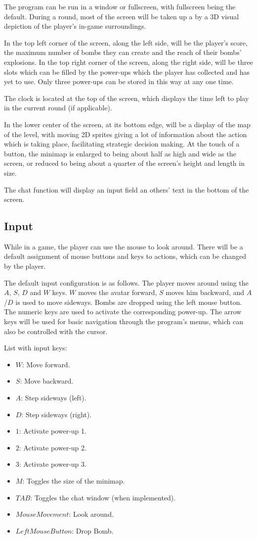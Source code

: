 \documentclass[a4paper,twoside,11pt]{article}
\begin{document}
The program can be run in a window or fullscreen, with fullscreen being the default. During a round, most of the screen will be taken up a by a 3D visual depiction of the player's in-game surroundings.

In the top left corner of the screen, along the left side, will be the player's score, the maximum number of bombs they can create and the reach of their bombs' explosions. In the top right corner of the screen, along the right side, will be three slots which can be filled by the power-ups which the player has collected and has yet to use. Only three power-ups can be stored in this way at any one time.

The clock is located at the top of the screen, which displays the time left to play in the current round (if applicable).

In the lower center of the screen, at its bottom edge, will be a display of the map of the level, with moving 2D sprites giving a lot of information about the action which is taking place, facilitating strategic decision making. At the touch of a button, the minimap is enlarged to being about half as high and wide as the screen, or reduced to being about a quarter of the screen's height and length in size.

The chat function will display an input field an others' text in the bottom of the screen.

\subsection{Input}

While in a game, the player can use the mouse to look around. There will be a default assignment of mouse buttons and keys to actions, which can be changed by the player.

The default input configuration is as follows. The player moves around using the $A$, $S$, $D$ and $W$ keys. $W$ moves the avatar forward, $S$ moves him backward, and $A$/$D$ is used to move sideways. Bombs are dropped using the left mouse button. The numeric keys are used to activate the corresponding power-up. The arrow keys will be used for basic navigation through the program's menus, which can also be controlled with the cursor.

List with input keys:
 \begin{itemize}
    \item $W$: Move forward.
    \item $S$: Move backward.
    \item $A$: Step sideways (left).
    \item $D$: Step sideways (right).
    \item $1$: Activate power-up 1.
    \item $2$: Activate power-up 2.
    \item $3$: Activate power-up 3.
    \item $M$: Toggles the size of the minimap.
    \item $TAB$: Toggles the chat window (when implemented).
    \item $Mouse Movement$: Look around.
    \item $Left Mouse Button$: Drop Bomb.
 \end{itemize}
\end{document}
